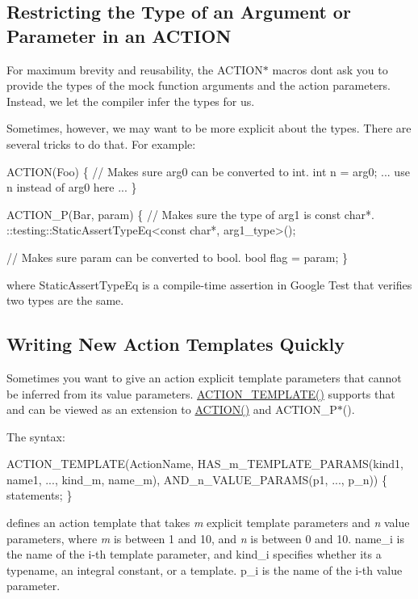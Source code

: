 \subsection*{Restricting the Type of an Argument or Parameter in an A\+C\+T\+I\+ON}

For maximum brevity and reusability, the {\ttfamily A\+C\+T\+I\+O\+N$\ast$} macros don\textquotesingle{}t ask you to provide the types of the mock function arguments and the action parameters. Instead, we let the compiler infer the types for us.

Sometimes, however, we may want to be more explicit about the types. There are several tricks to do that. For example\+: 
\begin{DoxyCode}
ACTION(Foo) \{
  // Makes sure arg0 can be converted to int.
  int n = arg0;
  ... use n instead of arg0 here ...
\}

ACTION\_P(Bar, param) \{
  // Makes sure the type of arg1 is const char*.
  ::testing::StaticAssertTypeEq<const char*, arg1\_type>();

  // Makes sure param can be converted to bool.
  bool flag = param;
\}
\end{DoxyCode}
 where {\ttfamily Static\+Assert\+Type\+Eq} is a compile-\/time assertion in Google Test that verifies two types are the same.

\subsection*{Writing New Action Templates Quickly}

Sometimes you want to give an action explicit template parameters that cannot be inferred from its value parameters. {\ttfamily \hyperlink{gmock-generated-actions_8h_ad04fa741f313f0c23924d61fcfb1536d}{A\+C\+T\+I\+O\+N\+\_\+\+T\+E\+M\+P\+L\+A\+T\+E()}} supports that and can be viewed as an extension to {\ttfamily \hyperlink{gmock-generated-actions_8h_a7af7137aa4871df4235881af377205fe}{A\+C\+T\+I\+O\+N()}} and {\ttfamily A\+C\+T\+I\+O\+N\+\_\+\+P$\ast$()}.

The syntax\+: 
\begin{DoxyCode}
ACTION\_TEMPLATE(ActionName,
                HAS\_m\_TEMPLATE\_PARAMS(kind1, name1, ..., kind\_m, name\_m),
                AND\_n\_VALUE\_PARAMS(p1, ..., p\_n)) \{ statements; \}
\end{DoxyCode}


defines an action template that takes {\itshape m} explicit template parameters and {\itshape n} value parameters, where {\itshape m} is between 1 and 10, and {\itshape n} is between 0 and 10. {\ttfamily name\+\_\+i} is the name of the i-\/th template parameter, and {\ttfamily kind\+\_\+i} specifies whether it\textquotesingle{}s a {\ttfamily typename}, an integral constant, or a template. {\ttfamily p\+\_\+i} is the name of the i-\/th value parameter.

